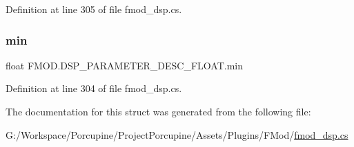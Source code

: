 Definition at line 305 of file fmod\+\_\+dsp.\+cs.

\mbox{\label{struct_f_m_o_d_1_1_d_s_p___p_a_r_a_m_e_t_e_r___d_e_s_c___f_l_o_a_t_a4cc282249844dbf2fdfda7e5c69c1e73}} 
\subsubsection{\texorpdfstring{min}{min}}
{\footnotesize\ttfamily float F\+M\+O\+D.\+D\+S\+P\+\_\+\+P\+A\+R\+A\+M\+E\+T\+E\+R\+\_\+\+D\+E\+S\+C\+\_\+\+F\+L\+O\+A\+T.\+min}



Definition at line 304 of file fmod\+\_\+dsp.\+cs.



The documentation for this struct was generated from the following file\+:\begin{DoxyCompactItemize}
\item 
G\+:/\+Workspace/\+Porcupine/\+Project\+Porcupine/\+Assets/\+Plugins/\+F\+Mod/\hyperlink{fmod__dsp_8cs}{fmod\+\_\+dsp.\+cs}\end{DoxyCompactItemize}
